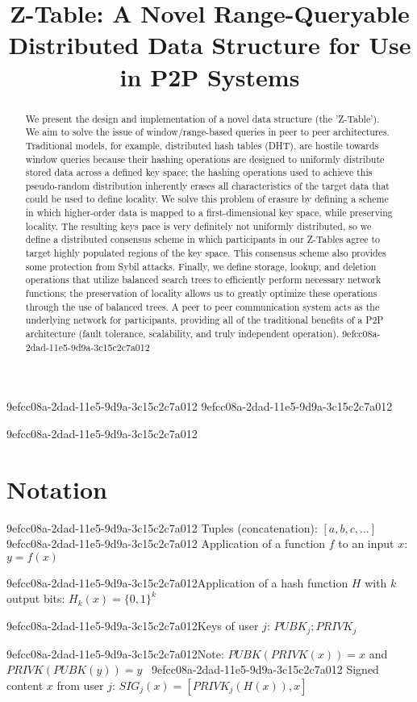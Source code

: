 \documentclass[12pt]{article}
\title{Z-Table: A Novel Range-Queryable Distributed Data Structure for Use in P2P Systems}
\begin{document}
9efcc08a-2dad-11e5-9d9a-3c15c2c7a012
9efcc08a-2dad-11e5-9d9a-3c15c2c7a012\maketitle

\begin{abstract}
We present the design and implementation of a novel data structure (the 'Z-Table'). We aim to solve the issue of window/range-based queries in peer to peer architectures. Traditional models, for example,  distributed hash tables (DHT), are hostile towards window queries because their hashing operations are designed to uniformly distribute stored data across a defined key space; the hashing operations used to achieve this pseudo-random distribution inherently erases all characteristics of the target data that could be used to define locality. We solve this problem of erasure by defining a scheme in which higher-order data is mapped to a first-dimensional key space, while preserving locality. The resulting keys pace is very definitely not uniformly distributed, so we define a distributed consensus scheme in which participants in our Z-Tables agree to target highly populated regions of the key space. This consensus scheme also provides some protection from Sybil attacks. Finally, we define storage, lookup, and deletion operations that utilize balanced search trees to efficiently perform necessary network functions; the preservation of locality allows us to greatly optimize these operations through the use of balanced trees. A peer to peer communication system acts as the underlying network for participants, providing all of the traditional benefits of a P2P architecture (fault tolerance, scalability, and truly independent operation).
9efcc08a-2dad-11e5-9d9a-3c15c2c7a012\end{abstract}
9efcc08a-2dad-11e5-9d9a-3c15c2c7a012
\section{Notation}
9efcc08a-2dad-11e5-9d9a-3c15c2c7a012
Tuples (concatenation): $[a,b,c,...]$
9efcc08a-2dad-11e5-9d9a-3c15c2c7a012
Application of a function $f$ to an input $x$: $y=f(x)$

9efcc08a-2dad-11e5-9d9a-3c15c2c7a012Application of a hash function $H$ with $k$ output bits: $H_{k}(x) = \{0,1\}^k$

9efcc08a-2dad-11e5-9d9a-3c15c2c7a012Keys of user $j$: $ PUBK_j; PRIVK_j $

9efcc08a-2dad-11e5-9d9a-3c15c2c7a012Note: $PUBK(PRIVK(x)) = x$ and $PRIVK(PUBK(y)) = y$~
9efcc08a-2dad-11e5-9d9a-3c15c2c7a012
Signed content $x$ from user $j$: $SIG_j(x) = \left[ PRIVK_j( H(x) ), x \right]$
\end{document}
